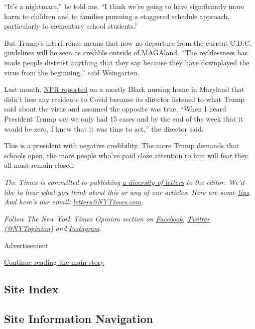 ``It's a nightmare,'' he told me. ``I think we're going to have
significantly more harm to children and to families pursuing a staggered
schedule approach, particularly to elementary school students.''

But Trump's interference means that now no departure from the current
C.D.C. guidelines will be seen as credible outside of MAGAland. ``The
recklessness has made people distrust anything that they say because
they have downplayed the virus from the beginning,'' said Weingarten.

Last month,
\href{https://www.npr.org/2020/06/28/884351948/how-one-maryland-nursing-home-avoided-covid-19}{NPR
reported} on a mostly Black nursing home in Maryland that didn't lose
any residents to Covid because its director listened to what Trump said
about the virus and assumed the opposite was true. ``When I heard
President Trump say we only had 15 cases and by the end of the week that
it would be zero, I knew that it was time to act,'' the director said.

This is a president with negative credibility. The more Trump demands
that schools open, the more people who've paid close attention to him
will fear they all must remain closed.

\emph{The Times is committed to publishing}
\href{https://www.nytimes3xbfgragh.onion/2019/01/31/opinion/letters/letters-to-editor-new-york-times-women.html}{\emph{a
diversity of letters}} \emph{to the editor. We'd like to hear what you
think about this or any of our articles. Here are some}
\href{https://help.nytimes3xbfgragh.onion/hc/en-us/articles/115014925288-How-to-submit-a-letter-to-the-editor}{\emph{tips}}\emph{.
And here's our email:}
\href{mailto:letters@NYTimes.com}{\emph{letters@NYTimes.com}}\emph{.}

\emph{Follow The New York Times Opinion section on}
\href{https://www.facebookcorewwwi.onion/nytopinion}{\emph{Facebook}}\emph{,}
\href{http://twitter.com/NYTOpinion}{\emph{Twitter (@NYTopinion)}}
\emph{and}
\href{https://www.instagram.com/nytopinion/}{\emph{Instagram}}\emph{.}

Advertisement

\protect\hyperlink{after-bottom}{Continue reading the main story}

\hypertarget{site-index}{%
\subsection{Site Index}\label{site-index}}

\hypertarget{site-information-navigation}{%
\subsection{Site Information
Navigation}\label{site-information-navigation}}

